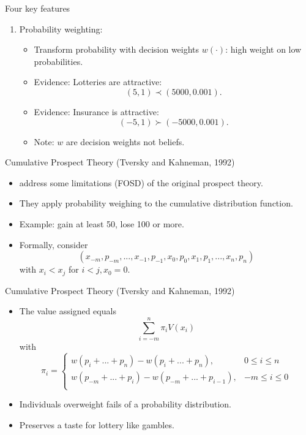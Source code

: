 \documentclass[11pt, aspectratio=169]{beamer}
\begin{document}
\begin{frame}{Four key features}
    \begin{enumerate}[4.]
        \item Probability weighting:\medskip
            \begin{itemize}
                \item Transform probability with decision weights $w(\cdot)$:
                high weight on low probabilities.\medskip
                \item Evidence: Lotteries are attractive: \[(5,1)\prec (5000,0.001).\]
                \item Evidence: Insurance is attractive: \[(-5,1)\succ (-5000,0.001).\]
            \item Note: $w$ are decision weights not beliefs.
        \end{itemize}
    \end{enumerate}
\end{frame}



\begin{frame}{Cumulative Prospect Theory (Tversky and Kahneman, 1992)}
    \begin{itemize}
        \item \citet{TverskyKahneman1992} address some limitations (FOSD) of the original \citet{KahnemanTversky1979} prospect theory.\bigskip
        \item They apply probability weighing to the cumulative distribution function.\bigskip
        \item Example: gain at least 50, lose 100 or more.\bigskip
        \item Formally, consider
        \[(x_{-m},p_{-m},...,x_{-1},p_{-1},x_0,p_0,x_1,p_1,...,x_n,p_n)\]
        with $x_i < x_j$ for $i<j,x_0=0$.\bigskip
         \end{itemize}
\end{frame}

\begin{frame}{Cumulative Prospect Theory (Tversky and Kahneman, 1992)}
    \begin{itemize}
       \item The value assigned equals
        \[ \sum_{i=-m}^{n} \pi_i V(x_i)\]
        with
            \begin{equation}
                \pi_i = \begin{cases}
                w(p_i+...+p_n) - w(p_i+...+p_n),  & 0\leq i \leq  n\\
                w(p_{-m}+...+p_i) - w(p_{-m}+...+p_{i-1}),  & -m\leq i \leq 0\\
            \end{cases}
            \end{equation}\medskip
        \item Individuals overweight fails of a probability distribution.\medskip
        \item Preserves a taste for lottery like gambles.\medskip
    \end{itemize}
\end{frame}
\end{document}

